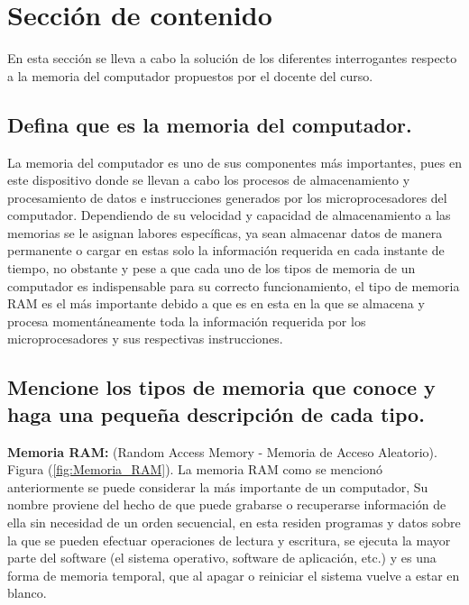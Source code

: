 \documentclass{article}
\begin{document}
\section{Sección de contenido} \label{contenido}
En esta sección se lleva a cabo la solución de los diferentes interrogantes respecto a la memoria del computador propuestos por el docente del curso.

\subsection{Defina que es la memoria del computador.}

La memoria del computador es uno de sus componentes más importantes, pues en este dispositivo donde se llevan a cabo los procesos de almacenamiento y procesamiento de datos e instrucciones generados por los microprocesadores del computador. Dependiendo de su velocidad y capacidad de almacenamiento a las memorias se le asignan labores específicas, ya sean almacenar datos de manera permanente o cargar en estas solo la información requerida en cada instante de tiempo, no obstante y pese a que cada uno de los tipos de memoria de un computador es indispensable para su correcto funcionamiento, el tipo de memoria RAM es el más importante debido a que es en esta en la que se almacena y procesa momentáneamente toda la información requerida por los microprocesadores y sus respectivas instrucciones.

\subsection{Mencione los tipos de memoria que conoce y haga una pequeña descripción de cada tipo.}

\textbf{Memoria RAM:} (Random Access Memory - Memoria de Acceso Aleatorio). Figura (\ref{fig:Memoria_RAM}). 
La memoria RAM como se mencionó anteriormente se puede considerar la más importante de un computador, Su nombre proviene del hecho de que puede grabarse o recuperarse información de ella sin necesidad de un orden secuencial, en esta residen programas y datos sobre la que se pueden efectuar operaciones de lectura y escritura, se ejecuta la mayor parte del software (el sistema operativo, software de aplicación, etc.) y es una forma de memoria temporal, que al apagar o reiniciar el sistema vuelve a estar en blanco.\cite{Consepto.de}




\vspace{0.5cm}
\end{document}
